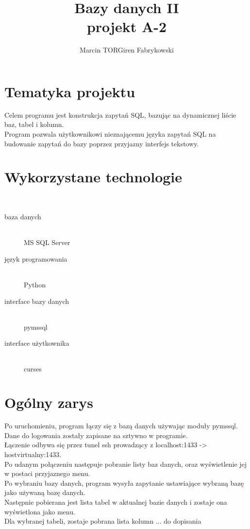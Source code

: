 \documentclass[a4paper,12pt]{article}
\author{Marcin TORGiren Fabrykowski}
\title{Bazy danych II\\ projekt A-2}
\begin{document}
\maketitle
\newpage
\tableofcontents
\newpage
\section{Tematyka projektu}
Celem programu jest konstrukcja zapytań SQL, bazując na dynamicznej liście baz, tabel i kolumn.\\
Program pozwala użytkownikowi nieznającemu języka zapytań SQL na budowanie zapytań do bazy poprzez przyjazny interfejs tekstowy.
\section{Wykorzystane technologie}\
\begin{description}
\item[baza danych]\hfill \\
	MS SQL Server
\item[język programowania]\hfill \\
	Python
\item[interface bazy danych]\hfill \\
	pymssql	
\item[interface użytkownika]\hfill \\
	curses
\end{description}
\section{Ogólny zarys}
Po uruchomieniu, program łączy się z bazą danych używając moduły pymssql.\\
Dane do logowania zostały zapisane na sztywno w programie.\\
Łączenie odbywa się przez tunel ssh prowadzący z localhost:1433 -> hostvirtualny:1433.\\
Po udanym połączeniu następuje pobranie listy baz danych, oraz wyświetlenie jej w postaci przyjaznego menu.\\
Po wybraniu bazy danych, program wysyła zapytanie ustawiające wybraną bazę jako używaną bazę danych.\\
Następnie pobierana jest lista tabel w aktualnej bazie danych i zostaje ona wyświetlona jako menu.\\
Dla wybranej tabeli, zostaje pobrana lista kolumn ... do dopisania
\end{document}
